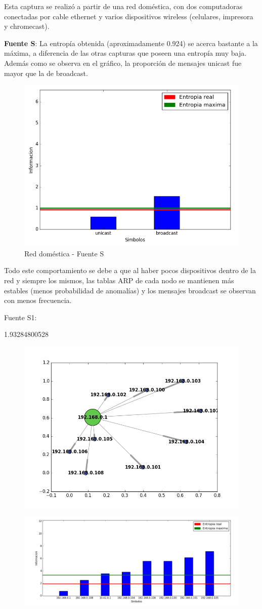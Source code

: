 Esta captura se realizó a partir de una red doméstica, con dos computadoras conectadas por cable ethernet y varios dispositivos wireless (celulares, impresora y chromecast).

\textbf{Fuente S}:
La entropía obtenida (aproximadamente 0.924) se acerca bastante a la máxima, a diferencia de las otras capturas que poseen una entropía muy baja. Además como se observa en el gráfico, la proporción de mensajes unicast fue mayor que la de broadcast.	

\begin{figure}[h]
\centering
\includegraphics[width=0.7\linewidth]{imagenes/red-dom-S}
\caption{Red doméstica - Fuente S}
\label{fig:red-dom-S}
\end{figure}

Todo este comportamiento se debe a que al haber pocos dispositivos dentro de la red y siempre los mismos, las tablas ARP de cada nodo se mantienen más estables (menos probabilidad de anomalías) y los mensajes broadcast se observan con menos frecuencia.

Fuente S1:

1.93284800528

\begin{figure}[h]
\centering
\includegraphics[width=0.7\linewidth]{imagenes/grafo-red-luis.png}
\caption{}
\label{fig:eth-red-domestica}
\end{figure}

\begin{figure}[h]
\centering
\includegraphics[width=0.7\linewidth]{imagenes/red-dom-S1}
\caption{}
\label{fig:red-dom-S1}
\end{figure}

